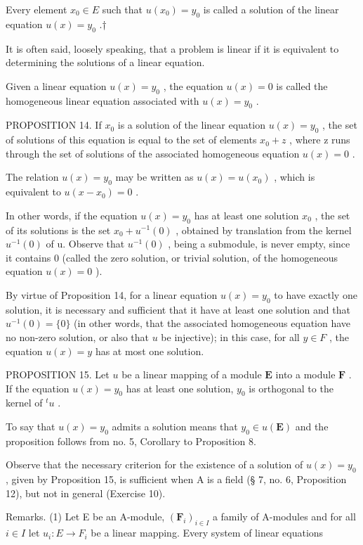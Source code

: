 Every element \(x_{0} \in E\) such that \(u(x_{0}) = y_{0}\) is called a solution of the linear equation \(u(x) = y_{0}\) .†

It is often said, loosely speaking, that a problem is linear if it is equivalent to determining the solutions of a linear equation.

Given a linear equation \(u(x) = y_{0}\) , the equation \(u(x) = 0\) is called the homogeneous linear equation associated with \(u(x) = y_{0}\) .

PROPOSITION 14. If \(x_{0}\) is a solution of the linear equation \(u(x) = y_{0}\) , the set of solutions of this equation is equal to the set of elements \(x_{0} + z\) , where z runs through the set of solutions of the associated homogeneous equation \(u(x) = 0\) .

The relation \(u(x) = y_0\) may be written as \(u(x) = u(x_0)\) , which is equivalent to \(u(x - x_0) = 0\) .

In other words, if the equation \(u(x) = y_{0}\) has at least one solution \(x_{0}\) , the set of its solutions is the set \(x_{0} + u^{-1}(0)\) , obtained by translation from the kernel \(u^{-1}(0)\) of u. Observe that \(u^{-1}(0)\) , being a submodule, is never empty, since it contains 0 (called the zero solution, or trivial solution, of the homogeneous equation \(u(x) = 0\) ).

By virtue of Proposition 14, for a linear equation \(u(x) = y_0\) to have exactly one solution, it is necessary and sufficient that it have at least one solution and that \(u^{-1}(0) = \{0\}\) (in other words, that the associated homogeneous equation have no non-zero solution, or also that \(u\) be injective); in this case, for all \(y \in F\) , the equation \(u(x) = y\) has at most one solution.

PROPOSITION 15. Let \(u\) be a linear mapping of a module \(\mathbf{E}\) into a module \(\mathbf{F}\) . If the equation \(u(x) = y_0\) has at least one solution, \(y_0\) is orthogonal to the kernel of \(^t u\) .

To say that \(u(x) = y_{0}\) admits a solution means that \(y_{0} \in u(\mathbf{E})\) and the proposition follows from no. 5, Corollary to Proposition 8.

Observe that the necessary criterion for the existence of a solution of \(u(x) = y_{0}\) , given by Proposition 15, is sufficient when A is a field (§ 7, no. 6, Proposition 12), but not in general (Exercise 10).

Remarks. (1) Let E be an A-module, \((\mathbf{F}_{i})_{i\in I}\) a family of A-modules and for all \(i\in I\) let \(u_{i}:E\to F_{i}\) be a linear mapping. Every system of linear equations

